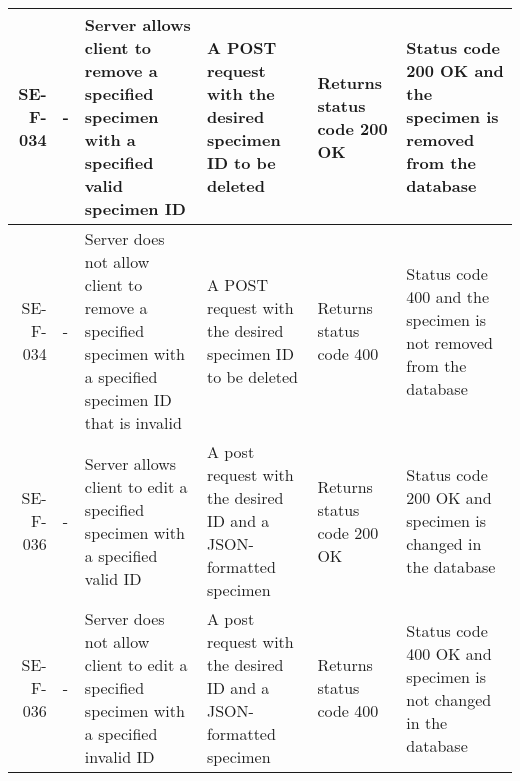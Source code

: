 \begin{landscape}
\begin{longtable}{|r|l|p{4cm}|p{4cm}|p{4cm}|p{4cm}|}
		SE-F-034 & -   & Server allows client to remove a specified specimen with a specified valid specimen ID &  A POST request with the desired specimen ID to be deleted &  Returns status code 200 OK &  Status code 200 OK and the specimen is removed from the database \\ \hline
		SE-F-034 & -   & Server does not allow client to remove a specified specimen with a specified specimen ID that is invalid&  A POST request with the desired specimen ID to be deleted &  Returns status code 400 &  Status code 400 and the specimen is not removed from the database \\ \hline
		SE-F-036 & -   & Server allows client to edit a specified specimen with a specified valid ID & A post request with the desired ID and a JSON-formatted specimen & Returns status code 200 OK  & Status code 200 OK and specimen is changed in the database \\ \hline
		SE-F-036 & -   & Server does not allow client to edit a specified specimen with a specified invalid ID & A post request with the desired ID and a JSON-formatted specimen & Returns status code 400  & Status code 400 OK and specimen is not changed in the database \\ \hline
		\end{longtable}
	\end{landscape}

